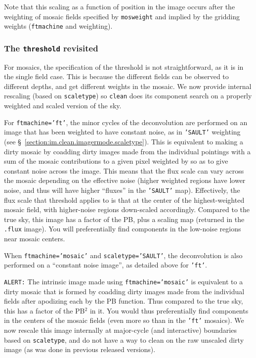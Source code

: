 Note that this scaling as a function of position in the image occurs
after the weighting of mosaic fields specified by {\tt mosweight}
and implied by the gridding weights ({\tt ftmachine} and {weighting}).

\subsubsection{The {\tt threshold} revisited}
\label{section:im.clean.imagermode.threshold}

For mosaics, the specification of the threshold is not
straightforward, as it is in the single field case.  This is because
the different fields can be observed to different depths, and get
different weights in the mosaic.  We now provide internal rescaling
(based on {\tt scaletype}) so {\tt clean} does
its component search on a properly weighted and scaled version of the sky.

For {\tt ftmachine='ft'}, the minor cycles of the deconvolution are
performed on an image that has been weighted to have constant noise,
as in {\tt 'SAULT'} weighting (see
\S~\ref{section:im.clean.imagermode.scaletype}).  This is equivalent to making
a dirty mosaic by coadding dirty images made from the individual 
pointings with a sum of the mosaic contributions to a given pixel
weighted by so as to give constant noise across the image.
This means that the flux scale can vary across the mosaic depending
on the effective noise (higher weighted regions have lower noise, and
thus will have higher ``fluxes'' in the {\tt 'SAULT'} map).  Effectively,
the flux scale that threshold applies to is that at the center of the
highest-weighted mosaic field, with higher-noise regions down-scaled
accordingly.  Compared to the true sky, this image has a factor of
the PB, plus a scaling map (returned in the {\tt .flux} image).
You will preferentially find components in the low-noise
regions near mosaic centers.

When {\tt ftmachine='mosaic'} and {\tt scaletype='SAULT'}, the
deconvolution is also performed on a ``constant noise image'',
as detailed above for {\tt 'ft'}. 

{\tt ALERT:} The intrinsic image made using {\tt ftmachine='mosaic'} is equivalent
to a dirty mosaic that is formed by coadding dirty images made from
the individual fields after apodizing each by the PB function.  Thus
compared to the true sky, this has a factor of the PB$^2$ in it.  You
would thus preferentially find components in the centers of the mosaic
fields (even more so than in the {\tt 'ft'} mosaics).  We now rescale
this image internally at major-cycle (and interactive) boundaries
based on {\tt scaletype}, and do not have a way to clean on the raw
unscaled dirty image (as was done in previous released versions).

